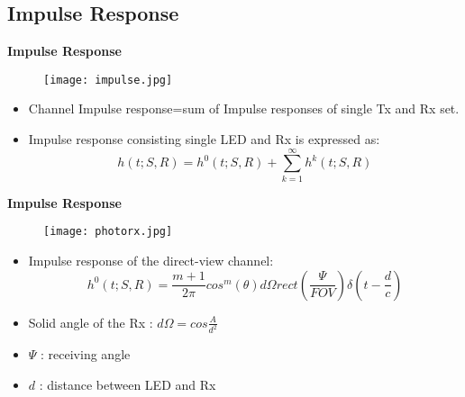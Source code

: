 \documentclass[9pt, dvipsnames]{beamer} %
\begin{document}
\subsection{Impulse Response}
 
   \begin{frame}{\textbf {Impulse Response}}
          
             \begin{figure}
               \texttt{[image: impulse.jpg]}
             \end{figure}
             \begin{itemize}
                \item Channel Impulse response=sum of Impulse responses of single Tx and Rx set.
                \item Impulse response consisting single LED and Rx is expressed as:
              \begin{equation}
                  h(t;S,R)=h^0(t;S,R)+\sum_{k=1}^{\infty}h^k(t;S,R)
              \end{equation}
             \end{itemize}
          
   \end{frame}
  
 
   \begin{frame}{\textbf {Impulse Response}}
             \begin{figure}
               \texttt{[image: photorx.jpg]}
             \end{figure}      
   
             \begin{itemize}
                \item  Impulse response of the direct-view channel:
                \begin{equation}
                    h^0(t;S,R)=\frac{m+1}{2\pi}cos^m(\theta)d\Omega rect(\frac{\Psi}{FOV})\delta(t-\frac{d}{c})
                \end{equation}
                \item Solid angle of the Rx : 
                   $ d\Omega=cos\frac{A}{d^2}$
    
                \item $\Psi$ : receiving angle
                \item $d$ : distance between LED and Rx
                    
             \end{itemize}
          
   \end{frame}
   
\end{document}
